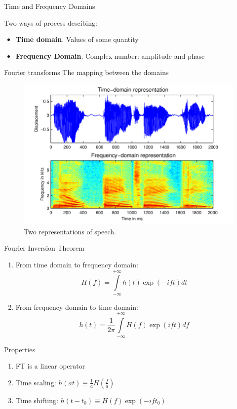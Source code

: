 \documentclass[10pt]{beamer}
\begin{document}
\begin{frame}[t]{Time and Frequency Domains}

Two ways of process descibing:

\begin{itemize}
    \item \textbf{Time domain}. Values of some quantity
    
    \item \textbf{Frequency Domain}. Complex number: amplitude and phase 
\end{itemize}

\begin{block}{Fourier transforms}
The mapping between the domains
\end{block}

    \begin{figure}
        \centering
        \includegraphics[width=.7\textwidth]{domains.png}
        \caption{Two representations of speech.}
    \end{figure}

\end{frame}


\begin{frame}{Fourier Inversion Theorem}

\begin{enumerate}
    \item From time domain to frequency domain:
    \begin{equation}
        H(f) = \int \limits_{-\infty}^{+\infty} h(t) \exp({- ift}) dt 
    \end{equation}
    
    \item From frequency domain to time domain:
    \begin{equation}
        h(t) = \frac{1}{2\pi}\int \limits_{-\infty}^{+\infty} H(f) \exp({ ift}) df
    \end{equation}
\end{enumerate}


\begin{block}{Properties}
\begin{enumerate}
    \item FT is a linear operator
    \item Time scaling: $h(at) \equiv \frac{1}{a}H(\frac{f}{a})$
    \item Time shifting: $h(t-t_0) \equiv H(f) \exp(- ift_0)$ 
\end{enumerate}

\end{block}

    
\end{frame}
\end{document}
